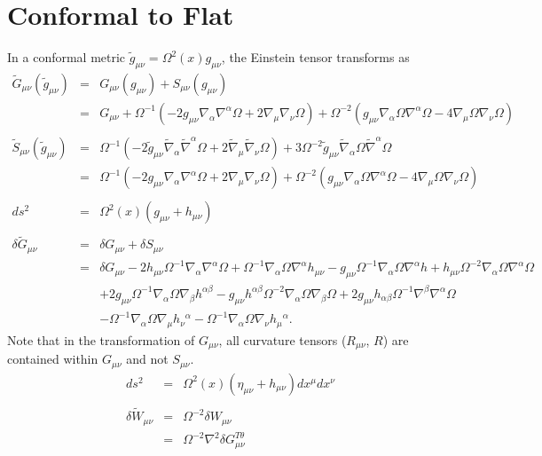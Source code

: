 \documentclass[10pt,letterpaper]{article}
\numberwithin{equation}{section}
\begin{document}
\section{Conformal to Flat}
In a conformal metric $\tilde g_{\mu\nu} = \Omega^2(x) g_{\mu\nu}$, the Einstein tensor transforms as
\begin{eqnarray}
\tilde G_{\mu\nu}(\tilde g_{\mu\nu}) &=& G_{\mu\nu}(g_{\mu\nu}) + S_{\mu\nu}(g_{\mu\nu})
\nonumber\\
&=& G_{\mu\nu}+\Omega^{-1}\left( -2 g_{\mu\nu}\nabla_\alpha \nabla^\alpha \Omega + 2\nabla_\mu \nabla_\nu \Omega\right) +
\Omega^{-2}\left(  g_{\mu\nu} \nabla_\alpha \Omega \nabla^\alpha \Omega - 4 \nabla_\mu \Omega \nabla_\nu \Omega\right)
\nonumber\\ \nonumber\\
\tilde S_{\mu\nu}(\tilde g_{\mu\nu}) &=& \Omega^{-1}\left( -2 \tilde g_{\mu\nu}\tilde\nabla_\alpha \tilde\nabla^\alpha \Omega + 2\tilde\nabla_\mu\tilde\nabla_\nu \Omega\right) + 3\Omega^{-2} \tilde g_{\mu\nu} \tilde\nabla_\alpha \Omega \tilde\nabla^\alpha \Omega
\nonumber\\
&=& \Omega^{-1}\left( -2 g_{\mu\nu}\nabla_\alpha \nabla^\alpha \Omega + 2\nabla_\mu \nabla_\nu \Omega\right) +
\Omega^{-2}\left(  g_{\mu\nu} \nabla_\alpha \Omega \nabla^\alpha \Omega - 4 \nabla_\mu \Omega \nabla_\nu \Omega\right)
\nonumber\\ \nonumber\\
ds^2 &=& \Omega^2(x)( g_{\mu\nu} + h_{\mu\nu})
\nonumber\\ \nonumber\\
\delta \tilde G_{\mu\nu} &=& \delta G_{\mu\nu} + \delta S_{\mu\nu}
\nonumber\\
&=& \delta G_{\mu\nu} -2 h_{\mu \nu} \Omega^{-1} \nabla_{\alpha}\nabla^{\alpha}\Omega
+ \Omega^{-1} \nabla_{\alpha}\Omega \nabla^{\alpha}h_{\mu \nu}
-   g_{\mu \nu} \Omega^{-1} \nabla_{\alpha}\Omega \nabla^{\alpha}h
+ h_{\mu \nu} \Omega^{-2} \nabla_{\alpha}\Omega \nabla^{\alpha}\Omega\nonumber\\
&& + 2  g_{\mu \nu} \Omega^{-1} \nabla_{\alpha}\Omega \nabla_{\beta}h^{\alpha \beta}
-   g_{\mu \nu} h^{\alpha \beta} \Omega^{-2} \nabla_{\alpha}\Omega \nabla_{\beta}\Omega
+ 2  g_{\mu \nu} h_{\alpha \beta} \Omega^{-1} \nabla^{\beta}\nabla^{\alpha}\Omega\nonumber\\
&& -  \Omega^{-1} \nabla_{\alpha}\Omega \nabla_{\mu}h_{\nu}{}^{\alpha}
-  \Omega^{-1} \nabla_{\alpha}\Omega \nabla_{\nu}h_{\mu}{}^{\alpha}.
\end{eqnarray}
Note that in the transformation of $G_{\mu\nu}$, all curvature tensors ($R_{\mu\nu}$, $R$) are contained within $G_{\mu\nu}$ and not $S_{\mu\nu}$. 
\begin{eqnarray}
ds^2 &=& \Omega^2(x)(\eta_{\mu\nu} + h_{\mu\nu})dx^\mu dx^\nu
\nonumber\\ \nonumber\\
\delta \tilde W_{\mu\nu}&=&\Omega^{-2} \delta W_{\mu\nu}
\nonumber\\
&=& \Omega^{-2} \nabla^2 \delta G_{\mu\nu}^{T\theta}
\end{eqnarray}
\end{document}
